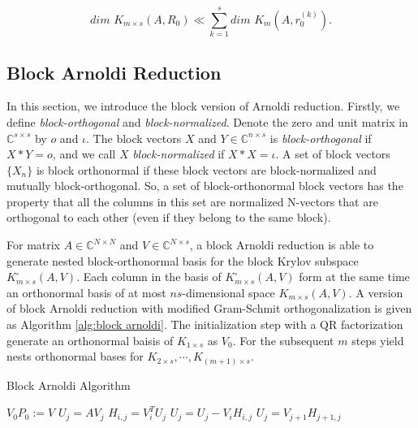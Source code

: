 \begin{equation}
	\textit{dim } K_{m\times s} (A, R_0) \ll \sum_{k=1}^{s} \textit{dim } K_{m} (A, r_0^{(k)}).
\end{equation}

\subsection{Block Arnoldi Reduction}

In this section, we introduce the block version of Arnoldi reduction. Firstly, we define \textit{block-orthogonal} and \textit{block-normalized}. Denote the zero and unit matrix in $\mathbb{C}^{s \times s}$ by $o$ and $\iota$. The block vectors $X$ and $Y \in \mathbb{C}^{n \times s}$ is \textit{block-orthogonal} if $X*Y=o$, and we call $X$ \textit{block-normalized} if $X*X=\iota$. A set of block vectors $\{X_n\}$ is block orthonormal if these block vectors are block-normalized and mutually block-orthogonal. So, a set of block-orthonormal block vectors has the property that all the columns in this set are normalized N-vectors that are orthogonal to each other (even if they belong to the same block).

For matrix $A \in \mathbb{C}^{N \times N}$ and $V \in \mathbb{C}^{N \times s}$, a block Arnoldi reduction is able to generate nested block-orthonormal basis for the block Krylov subspace $K_{m\times s}^{\square} (A,V)$. Each column in the basis of $K_{m\times s}^{\square} (A,V)$  form at the same time an orthonormal basis of at most $ns$-dimensional space $K_{m\times s}(A,V)$. A version of block Arnoldi reduction with modified Gram-Schmit orthogonalization is given as Algorithm \ref{alg:block arnoldi}. The initialization step with a QR factorization generate an orthonormal baisis of $K_{1\times s}$ as $V_0$. For the subsequent $m$ steps yield nests orthonormal bases for  $K_{2\times s}, \cdots,K_{{(m+1)}\times s}$. 

\begin{algorithm}[htbp]
	\caption{Block Arnoldi Algorithm}   
	\label{alg:block arnoldi}   
	\begin{algorithmic}[1]
		\State $V_0P_0 := V$ 
		\State $U_j = AV_{j}$  
		\State $H_{i,j} = V_i^T U_j$ 
		\State $U_j = U_j - V_iH_{i,j}$ 
		\EndFor
		\State $U_j = V_{j+1}H_{j+1,j}$  
		\EndFor 
		\EndFunction
	\end{algorithmic}  
\end{algorithm}

